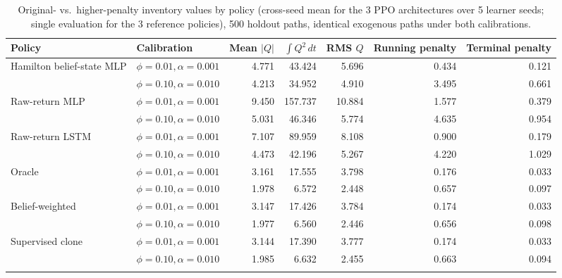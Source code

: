 \begin{table}[ht]
\centering
\small
\begin{tabular}{llrrrrr}
\toprule
Policy & Calibration & Mean $|Q|$ & $\int Q^2\,dt$ & RMS $Q$ & Running penalty & Terminal penalty \\
\midrule
Hamilton belief-state MLP & $\phi=0.01,\alpha=0.001$ & 4.771 & 43.424 & 5.696 & 0.434 & 0.121 \\
 & $\phi=0.10,\alpha=0.010$ & 4.213 & 34.952 & 4.910 & 3.495 & 0.661 \\
\addlinespace
Raw-return MLP & $\phi=0.01,\alpha=0.001$ & 9.450 & 157.737 & 10.884 & 1.577 & 0.379 \\
 & $\phi=0.10,\alpha=0.010$ & 5.031 & 46.346 & 5.774 & 4.635 & 0.954 \\
\addlinespace
Raw-return LSTM & $\phi=0.01,\alpha=0.001$ & 7.107 & 89.959 & 8.108 & 0.900 & 0.179 \\
 & $\phi=0.10,\alpha=0.010$ & 4.473 & 42.196 & 5.267 & 4.220 & 1.029 \\
\addlinespace
Oracle & $\phi=0.01,\alpha=0.001$ & 3.161 & 17.555 & 3.798 & 0.176 & 0.033 \\
 & $\phi=0.10,\alpha=0.010$ & 1.978 & 6.572 & 2.448 & 0.657 & 0.097 \\
\addlinespace
Belief-weighted & $\phi=0.01,\alpha=0.001$ & 3.147 & 17.426 & 3.784 & 0.174 & 0.033 \\
 & $\phi=0.10,\alpha=0.010$ & 1.977 & 6.560 & 2.446 & 0.656 & 0.098 \\
\addlinespace
Supervised clone & $\phi=0.01,\alpha=0.001$ & 3.144 & 17.390 & 3.777 & 0.174 & 0.033 \\
 & $\phi=0.10,\alpha=0.010$ & 1.985 & 6.632 & 2.455 & 0.663 & 0.094 \\
\addlinespace
\bottomrule
\end{tabular}
\caption{Original- vs.\ higher-penalty inventory values by policy (cross-seed mean for the 3 PPO architectures over 5 learner seeds; single evaluation for the 3 reference policies), 500 holdout paths, identical exogenous paths under both calibrations.}
\label{tab:ips-original-vs-high-penalty}
\end{table}

